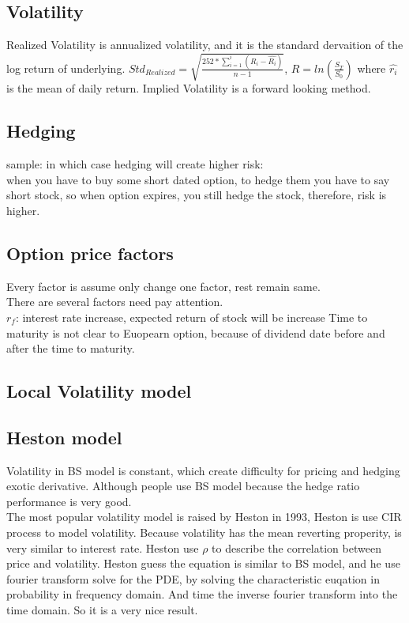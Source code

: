 \documentclass[a4paper,11pt]{article}
\begin{document}
\subsection{Volatility}
Realized Volatility is annualized volatility, and it is the standard dervaition of the log return of underlying. $Std_{Realized}=\sqrt{\frac{252*\sum_{i=1}^{i} (R_i-\hat{R_i})}{n-1}}$, $R=ln(\frac{S_T}{S_0})$ where $\hat{r_i}$ is the mean of daily return.
Implied Volatility is a forward looking method.
\subsection{Hedging}
sample: in which case hedging will create higher risk:\\
when you have to buy some short dated option, to hedge them you have to say short stock, so when option expires, you still hedge the stock, therefore, risk is higher. \\
\subsection{Option price factors}
Every factor is assume only change one factor, rest remain same. \\
There are several factors need pay attention.\\
$r_f$: interest rate increase, expected return of stock will be increase
Time to maturity is not clear to Euopearn option, because of dividend date before and after the time to maturity.\\








\subsection{Local Volatility model}
\subsection{Heston model}
Volatility in BS model is constant, which create difficulty for pricing and hedging exotic derivative. Although people use BS model because the hedge ratio performance is very good.\\
The most popular volatility model is raised by Heston in 1993,  Heston is use CIR process to model volatility. Because volatility has the mean reverting properity, is very similar to interest rate. Heston use $\rho$ to describe the correlation between price and volatility. Heston guess the equation is similar to BS model, and he use fourier transform solve for the PDE, by solving the characteristic euqation in probability in frequency domain. And time the inverse fourier transform into the time domain. So it is a very nice result.\\
\end{document}
